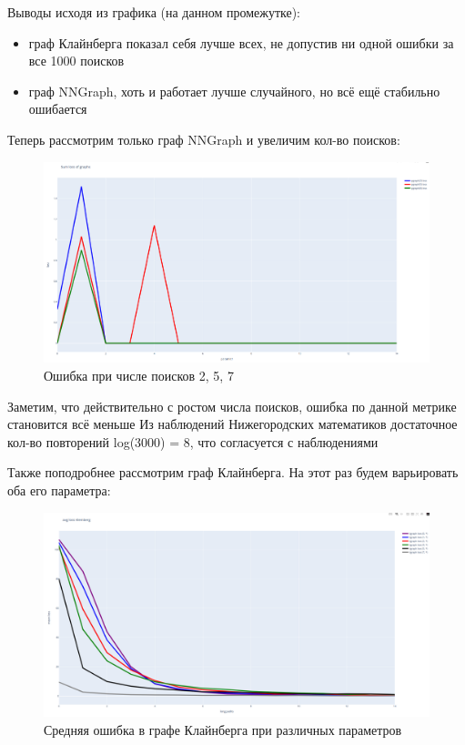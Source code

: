 Выводы исходя из графика (на данном промежутке):

\begin{itemize}
    \item граф Клайнберга показал себя лучше всех, не допустив ни одной ошибки за все 1000 поисков
    \item граф NNGraph, хоть и работает лучше случайного, но всё ещё стабильно ошибается
\end{itemize}

Теперь рассмотрим только граф NNGraph и увеличим кол-во поисков:
\begin{figure}[H]
    \centering
    \includegraphics[scale=0.25]{./pictures/sum_loss_Ponomarenko.png}
    \caption{Ошибка при числе поисков 2, 5, 7} \label{sum_loss_Ponomarenko}
\end{figure}

Заметим, что действительно с ростом числа поисков, ошибка по данной метрике становится всё меньше
Из наблюдений Нижегородских математиков достаточное кол-во повторений log(3000) = 8, что согласуется
с наблюдениями

Также поподробнее рассмотрим граф Клайнберга. На этот раз будем варьировать оба его параметра:

\begin{figure}[H]
    \centering
    \includegraphics[scale=0.25]{./pictures/Kleinberg_different_parametrs_loss.png}
    \caption{Средняя ошибка в графе Клайнберга при различных параметров} \label{Kleinberg_different_parameters_loss}
\end{figure}

